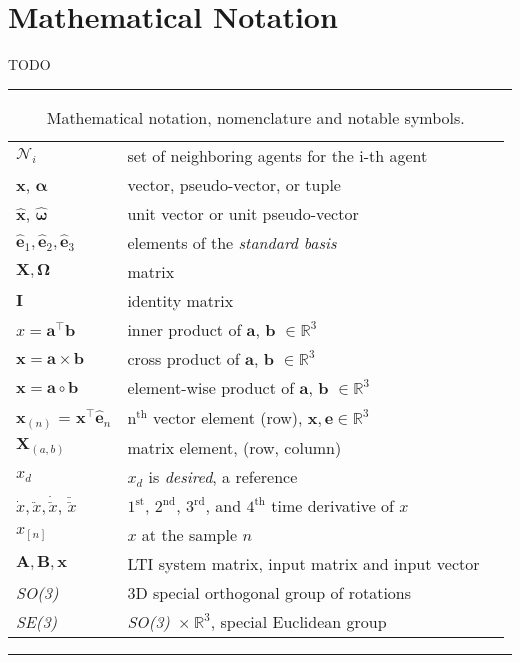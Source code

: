 \section{Mathematical Notation}

TODO

\begin{table*}[!h]
  \scriptsize
  \centering
  \noindent\rule{\textwidth}{0.5pt}
  \begin{tabular}{lll}

    $\mathcal{N}_i$ & set of neighboring agents for the i-th agent\\



    $\mathbf{x}$, $\bm{\alpha}$ & vector, pseudo-vector, or tuple\\
    $\mathbf{\hat{x}}$, $\bm{\hat{\omega}}$& unit vector or unit pseudo-vector\\
    $\mathbf{\hat{e}}_1, \mathbf{\hat{e}}_2, \mathbf{\hat{e}}_3$ & elements of the \emph{standard basis} \\
    $\mathbf{X}, \bm{\Omega}$ & matrix \\
    $\mathbf{I}$ & identity matrix \\
    $x = \mathbf{a}^\intercal\mathbf{b}$ & inner product of $\mathbf{a}$, $\mathbf{b}$ $\in \mathbb{R}^3$\\
    $\mathbf{x} = \mathbf{a}\times\mathbf{b}$ & cross product of $\mathbf{a}$, $\mathbf{b}$ $\in \mathbb{R}^3$\\
    $\mathbf{x} = \mathbf{a}\circ\mathbf{b}$ & element-wise product of $\mathbf{a}$, $\mathbf{b}$ $\in \mathbb{R}^3$ \\
    $\mathbf{x}_{(n)}$ = $\mathbf{x}^\intercal\mathbf{\hat{e}}_n$ & $\mathrm{n}^{\mathrm{th}}$ vector element (row), $\mathbf{x}, \mathbf{e} \in \mathbb{R}^3$\\
    $\mathbf{X}_{(a,b)}$ & matrix element, (row, column)\\
    $x_{d}$ & $x_d$ is \emph{desired}, a reference\\
    $\dot{x}, \ddot{x}, \dot{\ddot{x}}$, $\ddot{\ddot{x}}$ & ${1^{\mathrm{st}}}$, ${2^{\mathrm{nd}}}$, ${3^{\mathrm{rd}}}$, and ${4^{\mathrm{th}}}$ time derivative of $x$\\
    $x_{[n]}$ & $x$ at the sample $n$ \\
    $\mathbf{A}, \mathbf{B}, \mathbf{x}$ & LTI system matrix, input matrix and input vector\\
    \emph{SO(3)} & 3D special orthogonal group of rotations\\
    \emph{SE(3)} & \emph{SO(3)}~$\times~\mathbb{R}^3$, special Euclidean group\\
  \end{tabular}
  \noindent\rule{\textwidth}{0.5pt}
  \caption{Mathematical notation, nomenclature and notable symbols.}
  \label{tab:mathematical_notation}
\end{table*}
